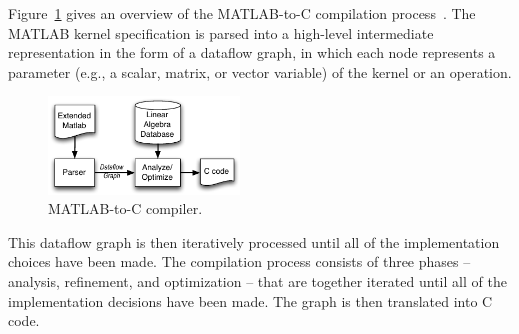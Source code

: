 \documentclass[runningheads]{llncs}
\begin{document}
Figure~\ref{fig:compiler} gives an overview of the MATLAB-to-C compilation process~\cite{Siek}. 
The MATLAB kernel specification is parsed into a high-level intermediate
representation in the form of a dataflow graph, in which each node represents
a parameter (e.g., a scalar, matrix, or vector variable) of the kernel or an operation.
%
\begin{figure}
\centering
\includegraphics[width=2in]{figures/compile.pdf}
\caption{MATLAB-to-C compiler.}
\label{fig:compiler}
\vspace{-.2in}
\end{figure}
%
This dataflow graph is then iteratively processed until all of
the implementation choices have been made.  The compilation process consists
of three phases -- analysis, refinement, and optimization -- that are together
iterated until all of the implementation decisions have been made.  The graph
is then translated into C code.

%
\end{document}
